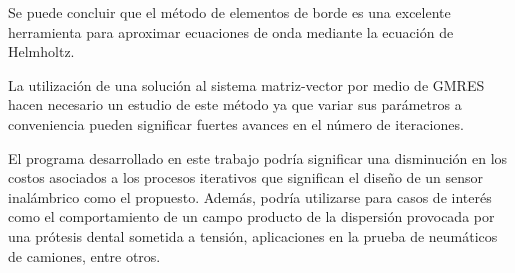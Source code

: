 \documentclass[12pt,letterpaper]{article}
\numberwithin{equation}{section}
\begin{document}
Se puede concluir que el método de elementos de borde es una excelente herramienta para aproximar ecuaciones de onda mediante la ecuación de Helmholtz.

La utilización de una solución al sistema matriz-vector por medio de GMRES hacen necesario un estudio de este método ya que variar sus parámetros a conveniencia pueden significar fuertes avances en el número de iteraciones. 

El programa desarrollado en este trabajo podría significar una disminución en los costos asociados a los procesos iterativos que significan el diseño de un sensor inalámbrico como el propuesto. Además, podría utilizarse para casos de interés como el comportamiento de un campo producto de la dispersión provocada por una prótesis dental sometida a tensión, aplicaciones en la prueba de neumáticos de camiones, entre otros.

\pagebreak
{}%
\end{document}
